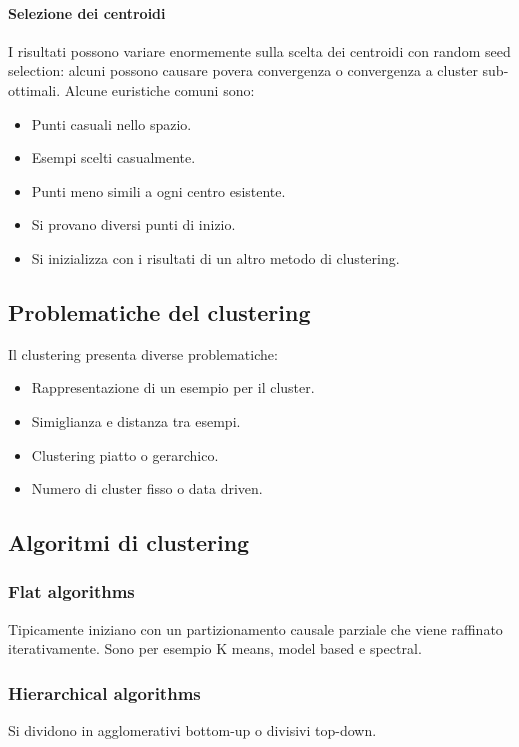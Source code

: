 \paragraph{Selezione dei centroidi}
I risultati possono variare enormemente sulla scelta dei centroidi con random seed selection: alcuni possono causare povera convergenza o convergenza a cluster sub-ottimali.
Alcune euristiche comuni sono:
\begin{multicols}{2}
	\begin{itemize}
		\item Punti casuali nello spazio.
		\item Esempi scelti casualmente.
		\item Punti meno simili a ogni centro esistente.
		\item Si provano diversi punti di inizio.
		\item Si inizializza con i risultati di un altro metodo di clustering.
	\end{itemize}
\end{multicols}

\subsection{Problematiche del clustering}
Il clustering presenta diverse problematiche:
\begin{multicols}{2}
	\begin{itemize}
		\item Rappresentazione di un esempio per il cluster.
		\item Simiglianza e distanza tra esempi.
		\item Clustering piatto o gerarchico.
		\item Numero di cluster fisso o data driven.
	\end{itemize}
\end{multicols}

\subsection{Algoritmi di clustering}

\subsubsection{Flat algorithms}
Tipicamente iniziano con un partizionamento causale parziale che viene raffinato iterativamente.
Sono per esempio K means, model based e spectral.

\subsubsection{Hierarchical algorithms}
Si dividono in agglomerativi bottom-up o divisivi top-down.

